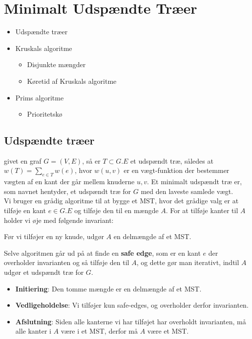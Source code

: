 \section{Minimalt Udspændte Træer}
\hrulefill

\begin{itemize}
\item Udspændte træer
\item Kruskals algoritme
  \begin{itemize}
  \item Disjunkte mængder
  \item Køretid af Kruskals algoritme
  \end{itemize}
\item Prims algoritme
  \begin{itemize}
    \item Prioritetskø
  \end{itemize}
\end{itemize}


\newpage
\subsection{Udspændte træer}
givet en graf $G = (V, E)$, så er $T \subset G.E$ et udspændt træ, således at $w(T) = \sum_{e \in T}w(e)$, hvor $w(u,v)$ er en vægt-funktion der bestemmer vægten af en kant der går mellem knuderne $u,v$. Et minimalt udspændt træ er, som navnet hentyder, et udspændt træ for $G$ med den laveste samlede vægt.\\

Vi bruger en grådig algoritme til at bygge et MST, hvor det grådige valg er at tilføje en kant $e \in G.E$ og tilføje den til en mængde $A$. For at tilføje kanter til $A$ holder vi øje med følgende invariant:
\begin{center}
Før vi tilføjer en ny knude, udgør $A$ en delmængde af et MST.
\end{center}

Selve algoritmen går ud på at finde en \textbf{safe edge}, som er en kant $e$ der overholder invarianten og så tilføje den til $A$, og dette gør man iterativt, indtil $A$ udgør et udspændt træ for $G$.\\
\begin{itemize}
\item \textbf{Initiering}: Den tomme mængde er en delmængde af et MST.\\
\item \textbf{Vedligeholdelse}: Vi tilføjer kun safe-edges, og overholder derfor invarianten.\\
\item \textbf{Afslutning}: Siden alle kanterne vi har tilføjet har overholdt invarianten, må alle kanter i $A$ være i et MST, derfor må $A$ være et MST.
\end{itemize}

